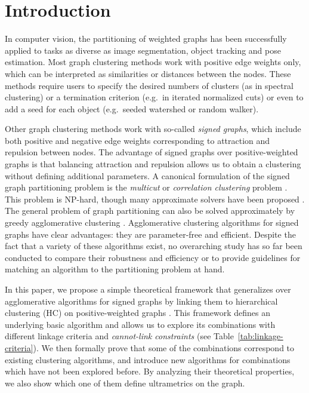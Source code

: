 \section{Introduction}
In computer vision, the partitioning of weighted graphs has been successfully applied to tasks as diverse as image segmentation, object tracking and pose estimation. 
Most graph clustering methods work with positive edge weights only, which can be interpreted as similarities or distances between the nodes. These methods require users to specify the desired numbers of clusters (as in spectral clustering) or a termination criterion (e.g.\ in iterated normalized cuts) or even to add a seed for each object  (e.g.\ seeded watershed or random walker).  

Other graph clustering methods work with so-called \emph{signed graphs}, which include both positive and negative edge weights corresponding to attraction and repulsion between nodes. The advantage of signed graphs over positive-weighted graphs is that balancing attraction and repulsion allows us to obtain a clustering without defining additional parameters. A canonical formulation of the signed graph partitioning problem is the \emph{multicut} or \emph{correlation clustering} problem \cite{kappes2011globally,chopra1991multiway}. This problem is NP-hard, though many approximate solvers have been proposed \cite{lange2018combinatorial,pape2017solving,beier2016efficient,yarkony2012fast}. The general problem of graph partitioning can also be solved approximately by greedy agglomerative clustering \cite{keuper2015efficient,levinkov2017comparative,wolf2018mutex,kardoostsolving}. 
Agglomerative clustering algorithms for signed graphs have clear advantages: they are parameter-free and efficient. Despite the fact that a variety of these algorithms exist, no overarching study has so far been conducted to compare their robustness and efficiency or to provide guidelines for matching an algorithm to the partitioning problem at hand. 


In this paper, we propose a simple theoretical framework that generalizes over agglomerative algorithms for signed graphs by linking them to hierarchical clustering (HC) on positive-weighted graphs \cite{lance1967general}. This framework defines an underlying basic algorithm and allows us to explore its combinations with different linkage criteria and \emph{cannot-link constraints} (see Table~\ref{tab:linkage-criteria}). 
We then formally prove that some of the combinations correspond to existing clustering algorithms, and introduce new algorithms for combinations which have not been explored before. By analyzing their theoretical properties, we also show which one of them define ultrametrics on the graph.

